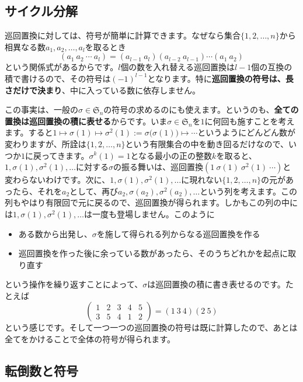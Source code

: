 \subsection{サイクル分解}

巡回置換に対しては、符号が簡単に計算できます。なぜなら集合$\{1, 2, \ldots, n\}$から相異なる数$a_1, a_2, \ldots, a_l$を取るとき
\[
(a_1 \ a_2 \ \cdots \ a_l) = (a_{l - 1} \ a_l) (a_{l - 2} \  a_{l - 1}) \cdots (a_1 \  a_2)
\]
という関係式があるからです。$l$個の数を入れ替える巡回置換は$l - 1$個の互換の積で書けるので、その符号は$(-1)^{l - 1}$となります。特に\textbf{巡回置換の符号は、長さだけで決まり}、中に入っている数に依存しません。

この事実は、一般の$\sigma \in \mathfrak{S}_n$の符号の求めるのにも使えます。というのも、\textbf{全ての置換は巡回置換の積に表せる}からです。いま$\sigma \in \mathfrak{S}_n$を$1$に何回も施すことを考えます。すると$1 \mapsto \sigma(1) \mapsto \sigma^2(1) := \sigma\bigl(\sigma(1)\bigr) \mapsto \cdots$というようにどんどん数が変わりますが、所詮は$\{1, 2, \ldots, n\}$という有限集合の中を動き回るだけなので、いつか$1$に戻ってきます。$\sigma^k(1) = 1$となる最小の正の整数$k$を取ると、$1, \sigma(1), \sigma^2(1), \ldots$に対する$\sigma$の振る舞いは、巡回置換$(1 \ \sigma(1) \ \sigma^2(1) \ \cdots)$と変わらないわけです。次に、$1, \sigma(1), \sigma^2(1), \ldots$に現れない$\{1, 2 ,\ldots, n\}$の元があったら、それを$a_2$として、再び$a_2, \sigma(a_2), \sigma^2(a_2), \ldots$という列を考えます。この列もやはり有限回で元に戻るので、巡回置換が得られます。しかもこの列の中には$1, \sigma(1), \sigma^2(1), \ldots$は一度も登場しません。このように
\begin{itemize}
\item ある数から出発し、$\sigma$を施して得られる列からなる巡回置換を作る
\item 巡回置換を作った後に余っている数があったら、そのうちどれかを起点に取り直す
\end{itemize}
という操作を繰り返すことによって、$\sigma$は巡回置換の積に書き表せるのです。たとえば
\[
\begin{pmatrix}
1 & 2 & 3 & 4 & 5 \\
3 & 5 & 4 & 1 & 2
\end{pmatrix}
= (1 \ 3 \ 4)(2 \ 5)
\]
という感じです。そして一つ一つの巡回置換の符号は既に計算したので、あとは全てをかけることで全体の符号が得られます。

\subsection{転倒数と符号}

